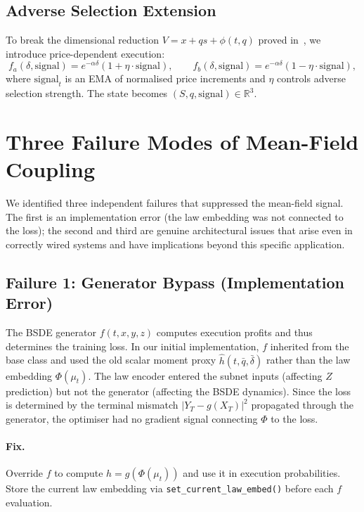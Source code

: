 \documentclass[11pt,a4paper]{article}
\newcommand{\R}{\mathbb{R}}
\newcommand{\mup}{\mu_t}
\begin{document}
\subsection{Adverse Selection Extension}

To break the dimensional reduction $V = x + qs + \phi(t,q)$ proved in~\cite{garry2026preprint1}, we introduce price-dependent execution:
\begin{equation}\label{eq:adverse}
  f_a(\delta, \text{signal}) = e^{-\alpha\delta}(1 + \eta \cdot \text{signal}), \qquad
  f_b(\delta, \text{signal}) = e^{-\alpha\delta}(1 - \eta \cdot \text{signal}),
\end{equation}
where $\text{signal}_t$ is an EMA of normalised price increments and $\eta$ controls adverse selection strength. The state becomes $(S, q, \text{signal}) \in \R^3$.

\section{Three Failure Modes of Mean-Field Coupling}
\label{sec:failures}

We identified three independent failures that suppressed the mean-field signal. The first is an implementation error (the law embedding was not connected to the loss); the second and third are genuine architectural issues that arise even in correctly wired systems and have implications beyond this specific application.

\subsection{Failure 1: Generator Bypass (Implementation Error)}

The BSDE generator $f(t, x, y, z)$ computes execution profits and thus determines the training loss. In our initial implementation, $f$ inherited from the base class and used the old scalar moment proxy $\hat{h}(t, \bar{q}, \bar{\delta})$ rather than the law embedding $\Phi(\mup)$. The law encoder entered the subnet inputs (affecting $Z$ prediction) but not the generator (affecting the BSDE dynamics). Since the loss is determined by the terminal mismatch $|Y_T - g(X_T)|^2$ propagated through the generator, the optimiser had no gradient signal connecting $\Phi$ to the loss.

\paragraph{Fix.} Override $f$ to compute $h = g(\Phi(\mup))$ and use it in execution probabilities. Store the current law embedding via \texttt{set\_current\_law\_embed()} before each $f$ evaluation.
\end{document}
